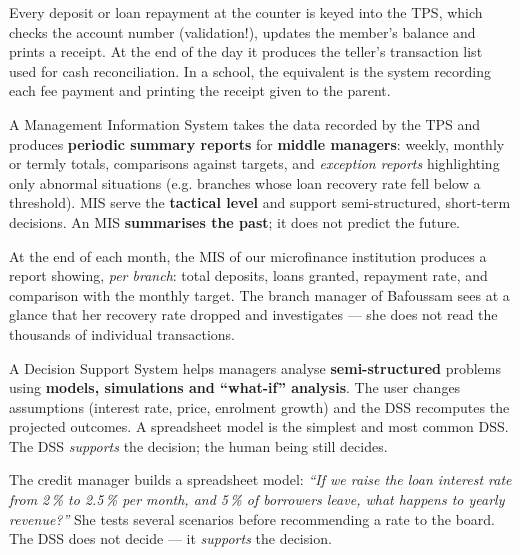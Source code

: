 \documentclass[11pt]{article}
\newcommand{\cle}[1]{{\popxbold\color{popdark}#1}}
\begin{document}
\begin{exemplebox}
Every deposit or loan repayment at the counter is keyed into the TPS, which checks the account number (validation!), updates the member's balance and prints a receipt. At the end of the day it produces the teller's transaction list used for cash reconciliation. In a school, the equivalent is the system recording each fee payment and printing the receipt given to the parent.
\end{exemplebox}

\begin{definition}
A \cle{Management Information System} takes the data recorded by the TPS and produces \textbf{periodic summary reports} for \textbf{middle managers}: weekly, monthly or termly totals, comparisons against targets, and \emph{exception reports} highlighting only abnormal situations (e.g. branches whose loan recovery rate fell below a threshold). MIS serve the \textbf{tactical level} and support semi-structured, short-term decisions. An MIS \textbf{summarises the past}; it does not predict the future.
\end{definition}

\begin{exemplebox}
At the end of each month, the MIS of our microfinance institution produces a report showing, \emph{per branch}: total deposits, loans granted, repayment rate, and comparison with the monthly target. The branch manager of Bafoussam sees at a glance that her recovery rate dropped and investigates --- she does not read the thousands of individual transactions.
\end{exemplebox}

\begin{definition}
A \cle{Decision Support System} helps managers analyse \textbf{semi-structured} problems using \textbf{models, simulations and ``what-if'' analysis}. The user changes assumptions (interest rate, price, enrolment growth) and the DSS recomputes the projected outcomes. A spreadsheet model is the simplest and most common DSS. The DSS \emph{supports} the decision; the human being still decides.
\end{definition}

\begin{exemplebox}
The credit manager builds a spreadsheet model: \emph{``If we raise the loan interest rate from 2\,\% to 2.5\,\% per month, and 5\,\% of borrowers leave, what happens to yearly revenue?''} She tests several scenarios before recommending a rate to the board. The DSS does not decide --- it \emph{supports} the decision.
\end{exemplebox}
\end{document}
